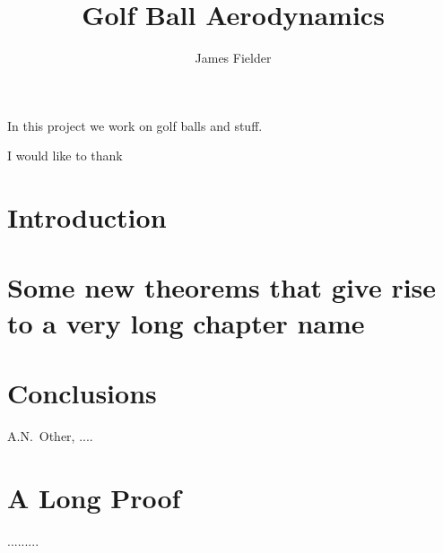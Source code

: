 \documentclass[12pt,MSc,twoside]{muthesis}
\begin{document}
\title{Golf Ball Aerodynamics}
\author{James Fielder}
\def\wordcount{xxxxx}




\beforeabstract

In this project we work on golf balls and stuff.

\afterabstract

I would like to thank

\afterpreface



\chapter{Introduction}


\chapter{Some new theorems that give rise to a very long chapter name}

\chapter{Conclusions}


\begin{thebibliography}{999}
 A.N.~Other, ....
\end{thebibliography}

\appendix
\chapter{A Long Proof}
.........

\end{document}
